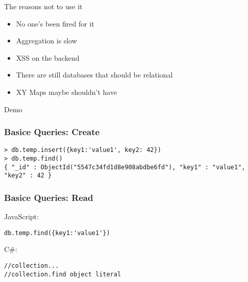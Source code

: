 \documentclass{beamer}
\begin{document}
\begin{frame}{The reasons not to use it}

\begin{itemize}
\item No one's been fired for it
\item Aggregation is slow
\item XSS on the backend
\item There are still databases that should be relational
\item XY Maps maybe shouldn't have
\end{itemize}

\end{frame}


\begin{frame}%

\begin{center}
   Demo
\end{center}

\end{frame}


\begin{frame}[fragile]

\frametitle{Basice Queries: Create}

\begin{lstlisting}
> db.temp.insert({key1:'value1', key2: 42})
> db.temp.find()
{ "_id" : ObjectId("5547c34fd1d8e908abdbe6fd"), "key1" : "value1", "key2" : 42 }
\end{lstlisting}


\end{frame}


\begin{frame}[fragile]

\frametitle{Basice Queries: Read}

JavaScript:
\begin{lstlisting}
db.temp.find({key1:'value1'})
\end{lstlisting}

C\#:
\begin{lstlisting}
//collection...
//collection.find object literal
\end{lstlisting}

\end{frame}
\end{document}
